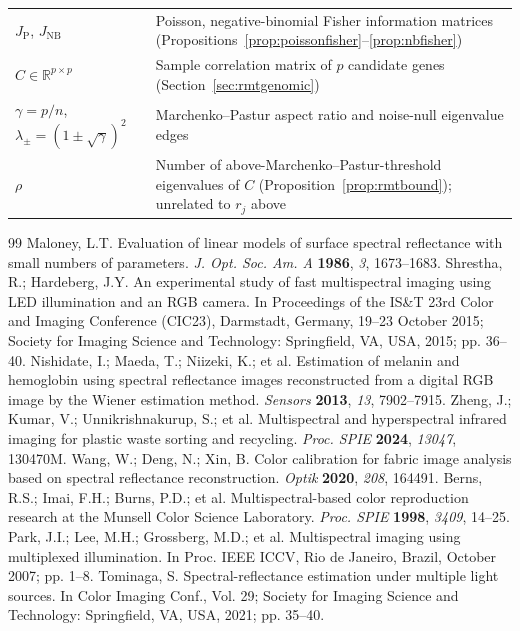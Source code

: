 \documentclass[11pt]{article}
\begin{document}
\begin{table}[H]
\begin{tabularx}{\textwidth}{lX}
$J_{\mathrm P}$, $J_{\mathrm{NB}}$ & Poisson, negative-binomial Fisher information matrices (Propositions~\ref{prop:poissonfisher}--\ref{prop:nbfisher})\\
$C\in\mathbb{R}^{p\times p}$ & Sample correlation matrix of $p$ candidate genes (Section~\ref{sec:rmtgenomic})\\
$\gamma=p/n$, $\lambda_\pm=(1\pm\sqrt\gamma)^2$ & Marchenko--Pastur aspect ratio and noise-null eigenvalue edges\\
$\rho$ & Number of above-Marchenko--Pastur-threshold eigenvalues of $C$ (Proposition~\ref{prop:rmtbound}); unrelated to $r_j$ above\\
\bottomrule
\end{tabularx}
\end{table}

\begin{thebibliography}{99}
Maloney, L.T. Evaluation of linear models of surface spectral reflectance with small numbers of parameters. \textit{J. Opt. Soc. Am. A} \textbf{1986}, \textit{3}, 1673--1683.
Shrestha, R.; Hardeberg, J.Y. An experimental study of fast multispectral imaging using LED illumination and an RGB camera. In Proceedings of the IS\&T 23rd Color and Imaging Conference (CIC23), Darmstadt, Germany, 19--23 October 2015; Society for Imaging Science and Technology: Springfield, VA, USA, 2015; pp. 36--40.
Nishidate, I.; Maeda, T.; Niizeki, K.; et al. Estimation of melanin and hemoglobin using spectral reflectance images reconstructed from a digital RGB image by the Wiener estimation method. \textit{Sensors} \textbf{2013}, \textit{13}, 7902--7915.
Zheng, J.; Kumar, V.; Unnikrishnakurup, S.; et al. Multispectral and hyperspectral infrared imaging for plastic waste sorting and recycling. \textit{Proc. SPIE} \textbf{2024}, \textit{13047}, 130470M.
Wang, W.; Deng, N.; Xin, B. Color calibration for fabric image analysis based on spectral reflectance reconstruction. \textit{Optik} \textbf{2020}, \textit{208}, 164491.
Berns, R.S.; Imai, F.H.; Burns, P.D.; et al. Multispectral-based color reproduction research at the Munsell Color Science Laboratory. \textit{Proc. SPIE} \textbf{1998}, \textit{3409}, 14--25.
Park, J.I.; Lee, M.H.; Grossberg, M.D.; et al. Multispectral imaging using multiplexed illumination. In Proc. IEEE ICCV, Rio de Janeiro, Brazil, October 2007; pp. 1--8.
Tominaga, S. Spectral-reflectance estimation under multiple light sources. In Color Imaging Conf., Vol. 29; Society for Imaging Science and Technology: Springfield, VA, USA, 2021; pp. 35--40.

\end{thebibliography}
\end{document}
